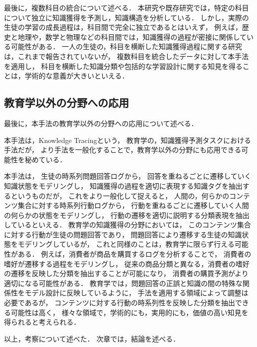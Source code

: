 最後に，複数科目の統合について述べる．
本研究や既存研究では，特定の科目について独立に知識獲得を予測し，知識構造を分析している．
しかし，実際の生徒の学習の成長過程は，科目間で完全に独立であるとはいえず，
例えば，歴史と地理や，数学と物理などの科目間では，知識獲得の過程が密接に関係している可能性がある．
一人の生徒の，科目を横断した知識獲得過程に関する研究は，これまで報告されていないが，
複数科目を統合したデータに対して本手法を適用し，
科目を横断した知識分類や包括的な学習設計に関する知見を得ることは，学術的な意義が大きいといえる．


\subsection{教育学以外の分野への応用}
最後に，本手法の教育学以外の分野への応用について述べる．

本手法は，Knowledge Tracingという，
教育学の，知識獲得予測タスクにおける手法だが，
より手法を一般化することで，教育学以外の分野にも応用できる可能性を秘めている．

本手法は，
生徒の時系列問題回答ログから，
回答を重ねるごとに遷移していく知識状態をモデリングし，
知識獲得の過程を適切に表現する知識タグを抽出するというものだが，
これをより一般化して捉えると，
人間の，何らかのコンテンツ集合に対する時系列行動ログから，
行動を重ねるごとに遷移していく人間の何らかの状態をモデリングし，
行動の遷移を適切に説明する分類表現を抽出しているといえる．
教育学の知識獲得の分野においては，
このコンテンツ集合に対する行動が生徒の問題回答であり，
問題回答により遷移する生徒の知識状態をモデリングしているが，
これと同様のことは，教育学に限らず行える可能性がある．
例えば，消費者が商品を購買するログを分析することで，
消費者の嗜好が遷移する過程をモデリングし，
従来の商品分類と異なる，消費者の嗜好の遷移を反映した分類を抽出することが可能になり，
消費者の購買予測がより適切になる可能性がある．
教育学では，問題回答の正誤と知識の間の特殊な関係性をモデル設計に反映しているように，
手法を適用する領域によって調整は必要であるが，
コンテンツに対する行動の時系列性を反映した分類を抽出できる可能性は高く，
様々な領域で，学術的にも，実用的にも，価値の高い知見を得られると考えられる．




\vvspace
以上，考察について述べた．
次章では，結論を述べる．

